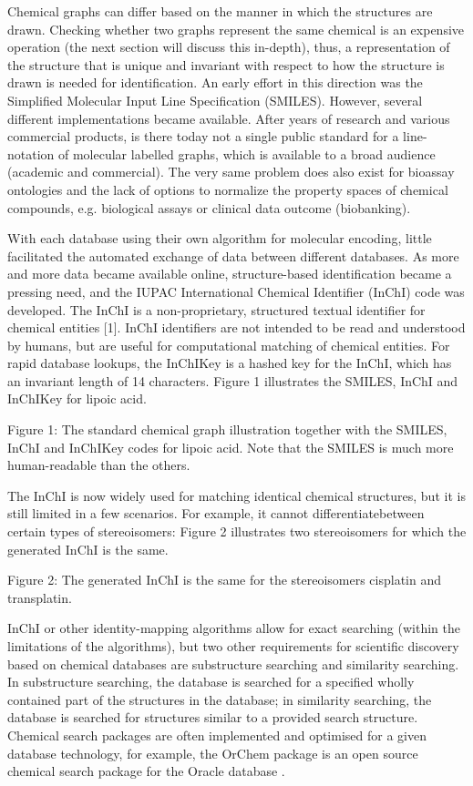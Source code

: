 \documentclass{sig-alternate}
\begin{document}
Chemical graphs can differ based on the manner in which the structures are
drawn. Checking whether two graphs represent the same chemical is an expensive
operation (the next section will discuss this in-depth), thus, a representation
of the structure that is unique and invariant with respect to how the structure
is drawn is needed for identification. An early effort in this direction was the
Simplified Molecular Input Line Specification (SMILES). However, several
different implementations became available. After years of research and various
commercial products, is there today not a single public standard for a
line-notation of molecular labelled graphs, which is available to a broad
audience (academic and commercial). The very same problem does also exist for
bioassay ontologies and the lack of options to normalize the property spaces of
chemical compounds, e.g. biological assays or clinical data outcome
(biobanking).
   
With each database using their own algorithm for molecular encoding, little
facilitated the automated exchange of data between different databases. As more
and more data became available online, structure-based identification became a
pressing need, and the IUPAC International Chemical Identifier (InChI) code was
developed. The InChI is a non-proprietary, structured textual identifier for
chemical entities [1]. InChI identifiers are not intended to be read and
understood by humans, but are useful for computational matching of chemical
entities. For rapid database lookups, the InChIKey is a hashed key for the
InChI, which has an invariant length of 14 characters. Figure 1 illustrates the
SMILES, InChI and InChIKey for lipoic acid.

Figure 1: The standard chemical graph illustration together with the SMILES,
InChI and InChIKey codes for lipoic acid. Note that the SMILES is much more
human-readable than the others.

The InChI is now widely used for matching identical chemical structures, but it
is still limited in a few scenarios. For example, it cannot differentiatebetween
certain types of stereoisomers: Figure 2 illustrates two stereoisomers for which
the generated InChI is the same.

Figure 2: The generated InChI is the same for the stereoisomers cisplatin and
transplatin.

InChI or other identity-mapping algorithms allow for exact searching (within the
limitations of the algorithms), but two other requirements for scientific
discovery based on chemical databases are substructure searching and similarity
searching. In substructure searching, the database is searched for a specified
wholly contained part of the structures in the database; in similarity
searching, the database is searched for structures similar to a provided search
structure. Chemical search packages are often implemented and optimised for a
given database technology, for example, the OrChem package is an open source
chemical search package for the Oracle database \cite{rijnbeek2009}.
\end{document}
